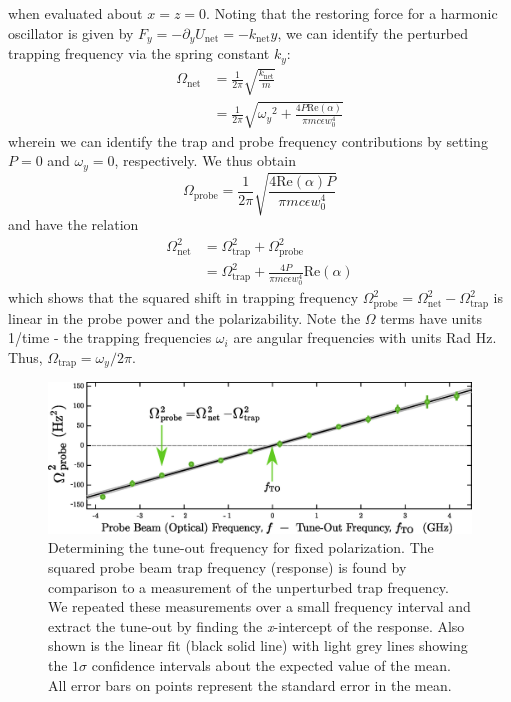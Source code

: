 	 when evaluated about $x=z=0$.
	 Noting that the restoring force for a harmonic oscillator is given by $F_y = -\partial_y U_\mathrm{net} = -k_\mathrm{net} y$, we can identify the perturbed trapping frequency via the spring constant $k_y$:
	 \begin{align}
	 	\Omega_\mathrm{net} &= \frac{1}{2\pi}\sqrt{\frac{k_\mathrm{net}}{m}}\\
	 	&= \frac{1}{2\pi}\sqrt{{\omega_y}^2+\frac{4 P \mathrm{Re}(\alpha)}{\pi m c \epsilon w_{0}^4}}
	 \end{align}
	wherein we can identify the trap and probe frequency contributions by setting $P=0$ and $\omega_y=0$, respectively. 
	We thus obtain 
	\begin{equation}
		\Omega_\mathrm{probe} = \frac{1}{2\pi}\sqrt{\frac{4 \mathrm{Re}(\alpha)  P}{\pi m c \epsilon w_{0}^4}}
		\label{eqn:omega_probe}
	\end{equation}
	and have the relation
	\begin{align}
		\Omega_\mathrm{net}^2 &= \Omega_\mathrm{trap}^2 + \Omega_\mathrm{probe}^2\\
		&= \Omega_\mathrm{trap}^2 + \frac{4P}{\pi m c \epsilon w_{0}^4}\mathrm{Re}(\alpha)
	\end{align}
	which shows that the squared shift in trapping frequency $\Omega_\mathrm{probe}^2 = \Omega_\mathrm{net}^2 - \Omega_\mathrm{trap}^2$ is linear in the probe power and the polarizability.
	Note the $\Omega$ terms have units 1/time - the trapping frequencies $\omega_i$ are angular frequencies with units Rad Hz. Thus, $\Omega_\textrm{trap} = \omega_y/2\pi$.
	
	\begin{figure}
	\includegraphics[width=\textwidth]{fig/tuneout/freq_scan}
	\caption{
	Determining the tune-out frequency for fixed polarization. The squared probe beam trap frequency (response) is found by comparison to a measurement of the unperturbed trap frequency. We repeated these measurements over a small frequency interval and extract the tune-out by finding the \textit{x}-intercept of the response. Also shown is the linear fit (black solid line) with light grey lines showing the \(1\sigma\) confidence intervals about the expected value of the mean. All error bars on points represent the standard error in the mean.
	}
	\label{fig:freq_scan} 
	\end{figure}

